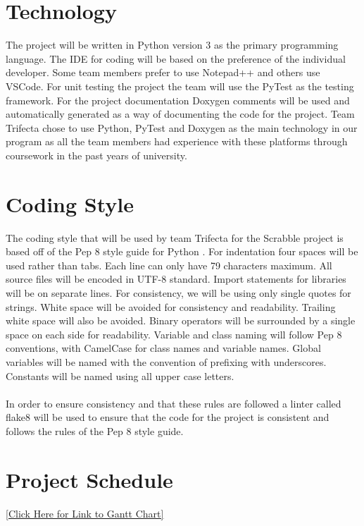 \documentclass{article}
\begin{document}
\section{Technology}
The project will be written in Python version 3 as the primary programming language. The IDE for coding will be based on the preference of the individual developer. Some team members prefer to use  Notepad++ and others use VSCode. For unit testing the project the team will use the PyTest as the testing framework. For the project documentation Doxygen comments will be used and automatically generated as a way of documenting the code for the project. Team Trifecta chose to use Python, PyTest and Doxygen as the main technology in our program as all the team members had experience with these platforms through coursework in the past years of university. 

\section{Coding Style} 
The coding style that will be used by team Trifecta for the Scrabble project is based off of the Pep 8 style guide for Python \cite{van_rossum_2013}. 
For indentation four spaces will be used rather than tabs. Each line can only have 79 characters maximum. All source files will be encoded in UTF-8 standard. Import statements for libraries will be on separate lines. For consistency, we will be using only single quotes for strings. White space will be avoided for consistency and readability. Trailing white space will also be avoided. Binary operators will be surrounded by a single space on each side for readability. Variable and class naming will follow Pep 8 conventions, with CamelCase for class names and variable names. Global variables will be named with the convention of prefixing with underscores. Constants will be named using all upper case letters. \\ \\
In order to ensure consistency and that these rules are followed a linter called flake8 will be used to ensure that the code for the project is consistent and follows the rules of the Pep 8 style guide. 

\section{Project Schedule}

\href{https://gitlab.cas.mcmaster.ca/choudhrk/thetrifecta_scrabble/blob/master/ProjectSchedule/3XA3\%20Gantt\%20Chart.pdf}{[Click Here for Link to Gantt Chart]}
\end{document}
